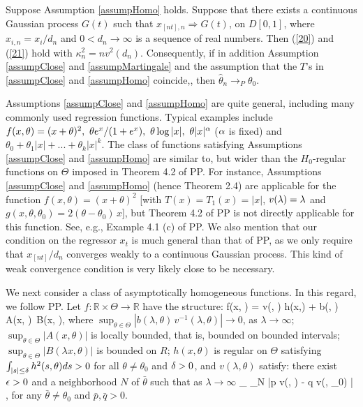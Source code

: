 \begin{thm}  Suppose Assumption \ref{assumpHomo} holds. Suppose that there exists a continuous Gaussian process $G(t)$ such that $x_{[nt], n} \Rightarrow G(t)$, on $D[0,1]$, where $x_{i,n} = x_i / d_n$  and $0 < d_n \to \infty$ is a sequence of real numbers.
Then (\ref {20}) and (\ref {21}) hold with $\kappa^2_n=nv^2(d_n)$. Consequently,
if in addition Assumption \ref{assumpClose} and \ref{assumpMartingale} and the assumption that the $T$'s in \ref{assumpClose} and \ref{assumpHomo} coincide,, then $\hat{\theta}_n \rightarrow_P \theta_0$.
\end{thm}


Assumptions \ref{assumpClose} and \ref{assumpHomo} are quite general, including many commonly used regression functions. Typical examples include $f(x, \theta)=(x+\theta)^2,\ \theta e^{x}/(1 + e^x),\ \theta \log |x|,\ \theta |x|^\alpha$ ($\alpha$ is fixed) and $\theta_0+\theta_1 |x|+...+\theta_k|x|^k$.
The class of functions satisfying Assumptions \ref{assumpClose} and \ref{assumpHomo} are similar to, but wider than the  $H_0$-regular functions on $\Theta$ imposed in Theorem 4.2 of PP. For instance,   Assumptions \ref{assumpClose} and \ref{assumpHomo} (hence Theorem 2.4) are applicable for   the function $f(x, \theta)=(x+\theta)^2$  [with $T(x)= T_1(x)=|x|$, $v(\lambda)=\lambda$ and $g(x, \theta, \theta_0)=2(\theta-\theta_0)\, x$], but Theorem 4.2 of PP is not  directly applicable for this function. See, e.g., Example 4.1 (c) of PP. We also mention that our condition on the regressor $x_t$ is much general than that of PP, as we only require that $x_{[nt]} / d_n$ converges weakly to a continuous Gaussian  process. This kind of weak convergence condition is very likely close to be necessary.

\medskip
We next consider  a class of asymptotically homogeneous functions. In this regard, we follow PP. Let $f:\mathbb{R} \times \Theta \rightarrow \mathbb{R} $ have the structure:
 \be
 f(\lambda x, \theta) = v(\lambda, \theta) h(x,\theta) + b(\lambda, \theta)\, A(x, \theta)\, B(\lambda x, \theta), 
 \ee
 where $\sup_{\theta\in \Theta}|b(\lambda, \theta)\, v^{-1}(\lambda, \theta)|\to 0$, as $\lambda\to \infty$; $\sup_{\theta\in \Theta}|A(x, \theta)|$ is locally bounded, that is, bounded on bounded intervals;
 $\sup_{\theta\in \Theta} |B(\lambda x, \theta)|$ is bounded on $R$; $h(x, \theta)$ is regular on $\Theta$ satisfying $\int_{|s| \le \delta} h^2(s, \theta)  ds > 0$   for all $\theta \ne \theta_0$ and $\delta > 0$,  and $v(\lambda, \theta)$ satisfy:   there exist $\epsilon > 0$ and a neighborhood $N$ of $\bar{\theta}$ such that as $\lambda \to \infty$
\be
\inf_{} \inf_{\theta \in N} |p v(\lambda, \theta) - q v(\lambda, \theta_0) | \to \infty,
\ee
for any $\bar{\theta} \ne \theta_0$ and $\bar{p}, \bar{q} > 0$.


